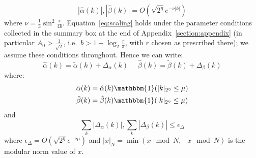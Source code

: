 \documentclass[aps,floatfix,10pt,amssymb,amsfont,amsmath,superscriptaddress,float,nofootinbib,longbibliography,nobalancelastpage,twocolumn]{revtex4-2}
\begin{document}
\begin{equation}
    |\hat \alpha(k)|,|\hat \beta(k)| = O\left( \sqrt{2^{\eta}}e^{-\nu |k|}\right)
    \label{eq:scaling}
\end{equation}
where $\nu = \frac{1}{3}\sin^2\frac{\pi}{4b}$. Equation~\eqref{eq:scaling} holds under the parameter conditions collected in the summary box at the end of Appendix~\ref{section:appendix} (in particular $A_0>\frac{1}{\sqrt{2}}$, i.e.\ $b > 1+\log_2\frac{r}{\pi}$, with $r$ chosen as prescribed there); we assume these conditions throughout. Hence we can write:
\begin{equation}
    \hat\alpha(k) = \tilde\alpha(k) + \Delta_{\alpha}(k) \>\>\>\>\>\>\hat\beta(k) = \tilde\beta(k) + \Delta_{\beta}(k)
    \label{eq:decomposealpha}
\end{equation}
where:
\begin{align}
    \tilde\alpha(k) &= \hat\alpha(k)\mathbbm{1}(|k|_{2^{\eta}}\leq \mu)\\
    \tilde\beta(k) &= \hat\beta(k)\mathbbm{1}(|k|_{2^{\eta}}\leq \mu)
    \label{eq:decomposealpha2}
\end{align}  and
\begin{equation}
    \sum_k|\Delta_\alpha(k)|,\sum_k|\Delta_\beta(k)|\leq \epsilon_{\Delta}
    \label{eq:decomposealpha3}
\end{equation} where $\epsilon_{\Delta} = O(\sqrt{2^{\eta}}e^{-\nu \mu})$ and $|x|_N = \min(x \mod N,- x\mod N)$ is the modular norm value of $x$.
\end{document}
